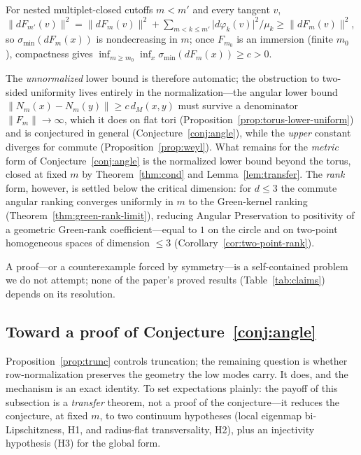 \documentclass[review]{siamart220329}
\begin{document}
\begin{proposition}\label{prop:sigmamin}
For nested multiplet-closed cutoffs $m<m'$ and every tangent $v$,
$\lVert dF_{m'}(v)\rVert^2=\lVert dF_m(v)\rVert^2+\sum_{m<k\le m'}\lvert d\varphi_k(v)\rvert^2/\mu_k
\ge\lVert dF_m(v)\rVert^2$, so $\sigma_{\min}(dF_m(x))$ is nondecreasing in $m$;
once $F_{m_0}$ is an immersion (finite $m_0$ \cite{berard1994}), compactness gives
$\inf_{m\ge m_0}\inf_{x}\sigma_{\min}(dF_m(x))\ge c>0$.
\end{proposition}

\noindent The \emph{unnormalized} lower bound is therefore automatic; the
obstruction to two-sided uniformity lives entirely in the normalization---the
angular lower bound $\lVert N_m(x)-N_m(y)\rVert\ge c\,d_M(x,y)$ must survive a
denominator $\lVert F_m\rVert\to\infty$, which it does on flat tori
(Proposition~\ref{prop:torus-lower-uniform}) and is conjectured in general
(Conjecture~\ref{conj:angle}), while the \emph{upper} constant diverges for commute
(Proposition~\ref{prop:weyl}). What remains for the \emph{metric} form of
Conjecture~\ref{conj:angle} is the normalized lower bound beyond the torus, closed at
fixed $m$ by Theorem~\ref{thm:cond} and Lemma~\ref{lem:transfer}. The \emph{rank}
form, however, is settled below the critical dimension: for $d\le3$ the commute
angular ranking converges uniformly in $m$ to the Green-kernel ranking
(Theorem~\ref{thm:green-rank-limit}), reducing Angular Preservation to positivity of a
geometric Green-rank coefficient---equal to $1$ on the circle and on two-point
homogeneous spaces of dimension $\le3$ (Corollary~\ref{cor:two-point-rank}).

\noindent A proof---or a counterexample forced by symmetry---is a self-contained
problem we do not attempt; none of the paper's proved results
(Table~\ref{tab:claims}) depends on its resolution.

\subsection{Toward a proof of Conjecture~\ref{conj:angle}}\label{sec:towardproof}
Proposition~\ref{prop:trunc} controls truncation; the remaining question is
whether row-normalization preserves the geometry the low modes carry. It does,
and the mechanism is an exact identity. To set expectations plainly: the payoff
of this subsection is a \emph{transfer} theorem, not a proof of the
conjecture---it reduces the conjecture, at fixed $m$, to two continuum
hypotheses (local eigenmap bi-Lipschitzness, H1, and radius-flat
transversality, H2), plus an injectivity hypothesis (H3) for the global form.
\end{document}
